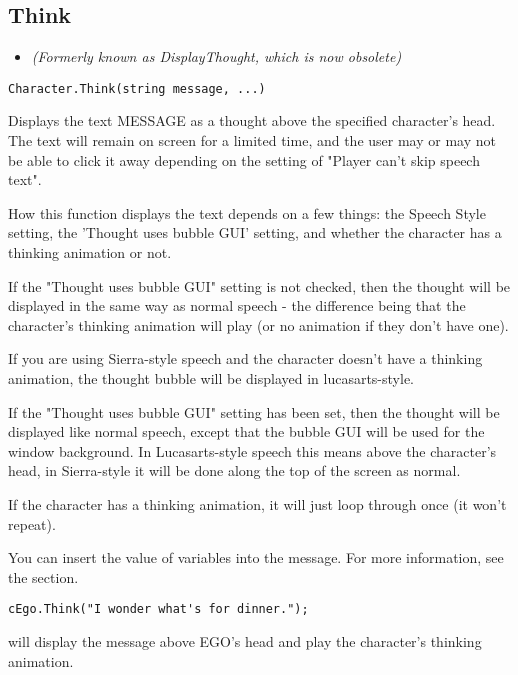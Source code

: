 \subsection{Think}\label{Character.Think}%

\begin{itemize}
\item \it{(Formerly known as DisplayThought, which is now obsolete)}
\end{itemize}

\begin{verbatim}
Character.Think(string message, ...)
\end{verbatim}
Displays the text MESSAGE as a thought above the specified character's head.
The text will remain on screen for a limited time, and the user may or may
not be able to click it away depending on the setting of "Player can't
skip speech text".

How this function displays the text depends on a few things: the Speech Style
setting, the 'Thought uses bubble GUI' setting, and whether the character has a thinking
animation or not.

If the "Thought uses bubble GUI" setting is not checked, then the thought will be displayed
in the same way as normal speech - the difference being that the character's thinking animation
will play (or no animation if they don't have one).

If you are using Sierra-style speech and the character doesn't have a thinking animation,
the thought bubble will be displayed in lucasarts-style.

If the "Thought uses bubble GUI" setting has been set, then the thought will be displayed
like normal speech, except that the bubble GUI will be used for the window background.
In Lucasarts-style speech this means above the character's head, in Sierra-style it will
be done along the top of the screen as normal.

If the character has a thinking animation, it will just loop through once (it won't repeat).

You can insert the value of variables into the message. For more information,
see the  section.

\begin{verbatim}
cEgo.Think("I wonder what's for dinner.");
\end{verbatim}
will display the message above EGO's head and play the character's thinking animation.

